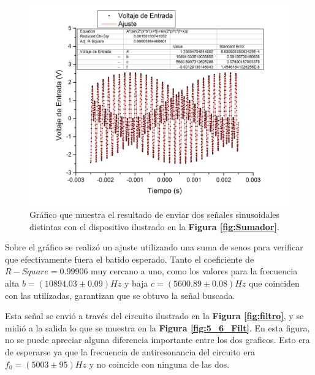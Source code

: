 \documentclass[11pt,a4paper]{article}
\begin{document}
\begin{figure}[H]
\centering
\includegraphics[scale=0.4]{5600hz.jpg}
\caption{Gráfico que muestra el resultado de enviar dos señales sinusoidales distintas con el dispositivo ilustrado en la \textbf{Figura \ref{fig:Sumador}}.}
\label{fig:5_6}
\end{figure}

Sobre el gráfico se realizó un ajuste utilizando una suma de senos para verificar que efectivamente fuera el batido esperado. Tanto el coeficiente de $R-Square = 0.99906$ muy cercano a uno, como los valores para la frecuencia alta $b = (10894.03 \pm 0.09)Hz$ y baja $c = (5600.89 \pm 0.08)Hz$ que coinciden con las utilizadas, garantizan que se obtuvo la señal buscada.

Esta señal se envió a través del circuito ilustrado en la \textbf{Figura \ref{fig:filtro}}, y se midió a la salida lo que se muestra en la \textbf{Figura \ref{fig:5_6_Filt}}. En esta figura, no se puede apreciar alguna diferencia importante entre los dos graficos. Esto era de esperarse ya que la frecuencia de antiresonancia del circuito era $f_0= (5003 \pm 95)Hz$ y no coincide con ninguna de las dos.
\end{document}
